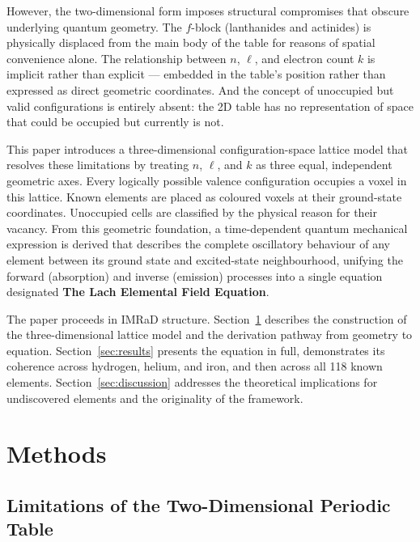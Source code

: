 \documentclass[12pt, a4paper]{article}
\begin{document}
However, the two-dimensional form imposes structural compromises that obscure underlying
quantum geometry. The $f$-block (lanthanides and actinides) is physically displaced from the
main body of the table for reasons of spatial convenience alone. The relationship between
$n$, $\ell$, and electron count $k$ is implicit rather than explicit --- embedded in the table's
position rather than expressed as direct geometric coordinates. And the concept of
unoccupied but valid configurations is entirely absent: the 2D table has no representation of
space that could be occupied but currently is not.

This paper introduces a three-dimensional configuration-space lattice model that resolves
these limitations by treating $n$, $\ell$, and $k$ as three equal, independent geometric
axes. Every logically possible valence configuration occupies a voxel in this lattice. Known
elements are placed as coloured voxels at their ground-state coordinates. Unoccupied cells
are classified by the physical reason for their vacancy. From this geometric foundation, a
time-dependent quantum mechanical expression is derived that describes the complete
oscillatory behaviour of any element between its ground state and excited-state
neighbourhood, unifying the forward (absorption) and inverse (emission) processes into a
single equation designated \textbf{The Lach Elemental Field Equation}.

The paper proceeds in IMRaD structure. Section~\ref{sec:methods} describes the
construction of the three-dimensional lattice model and the derivation pathway from
geometry to equation. Section~\ref{sec:results} presents the equation in full, demonstrates
its coherence across hydrogen, helium, and iron, and then across all 118 known elements.
Section~\ref{sec:discussion} addresses the theoretical implications for undiscovered
elements and the originality of the framework.

\section{Methods}
\label{sec:methods}

\subsection{Limitations of the Two-Dimensional Periodic Table}
\end{document}
